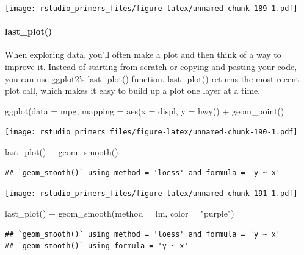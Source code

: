 \documentclass[
]{article}
\newenvironment{Shaded}{\begin{snugshade}}{\end{snugshade}}
\newcommand{\AttributeTok}[1]{\textcolor[rgb]{0.77,0.63,0.00}{#1}}
\newcommand{\FunctionTok}[1]{\textcolor[rgb]{0.00,0.00,0.00}{#1}}
\newcommand{\NormalTok}[1]{#1}
\newcommand{\SpecialCharTok}[1]{\textcolor[rgb]{0.00,0.00,0.00}{#1}}
\newcommand{\StringTok}[1]{\textcolor[rgb]{0.31,0.60,0.02}{#1}}
\begin{document}
\texttt{[image: rstudio\_primers\_files/figure-latex/unnamed-chunk-189-1.pdf]}

\hypertarget{last_plot}{%
\paragraph{last\_plot()}\label{last_plot}}

When exploring data, you'll often make a plot and then think of a way to
improve it. Instead of starting from scratch or copying and pasting your
code, you can use ggplot2's last\_plot() function. last\_plot() returns
the most recent plot call, which makes it easy to build up a plot one
layer at a time.

\begin{Shaded}
\begin{Highlighting}[]
\FunctionTok{ggplot}\NormalTok{(}\AttributeTok{data =}\NormalTok{ mpg, }\AttributeTok{mapping =} \FunctionTok{aes}\NormalTok{(}\AttributeTok{x =}\NormalTok{ displ, }\AttributeTok{y =}\NormalTok{ hwy)) }\SpecialCharTok{+}
  \FunctionTok{geom\_point}\NormalTok{()}
\end{Highlighting}
\end{Shaded}

\texttt{[image: rstudio\_primers\_files/figure-latex/unnamed-chunk-190-1.pdf]}

\begin{Shaded}
\begin{Highlighting}[]
\FunctionTok{last\_plot}\NormalTok{() }\SpecialCharTok{+}
  \FunctionTok{geom\_smooth}\NormalTok{()}
\end{Highlighting}
\end{Shaded}

\begin{verbatim}
## `geom_smooth()` using method = 'loess' and formula = 'y ~ x'
\end{verbatim}

\texttt{[image: rstudio\_primers\_files/figure-latex/unnamed-chunk-191-1.pdf]}

\begin{Shaded}
\begin{Highlighting}[]
\FunctionTok{last\_plot}\NormalTok{() }\SpecialCharTok{+}
  \FunctionTok{geom\_smooth}\NormalTok{(}\AttributeTok{method =}\NormalTok{ lm, }\AttributeTok{color =} \StringTok{"purple"}\NormalTok{)}
\end{Highlighting}
\end{Shaded}

\begin{verbatim}
## `geom_smooth()` using method = 'loess' and formula = 'y ~ x'
## `geom_smooth()` using formula = 'y ~ x'
\end{verbatim}
\end{document}
